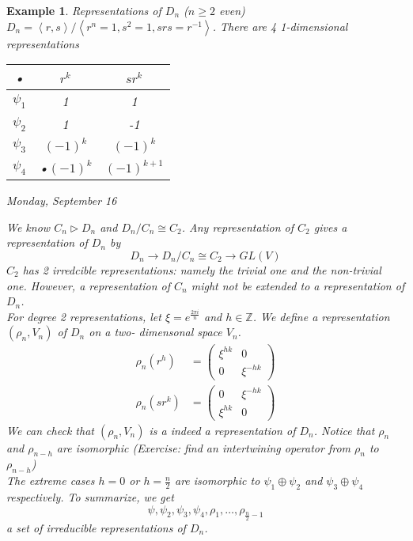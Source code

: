 \documentclass[letterpaper, leqno, 12pt]{article}
\newcommand{\fin}{\qquad \quad \hfill \framebox[1.75mm][l]{\,}}
\newcommand{\bZ}{\mathbb{Z}}
\providecommand{\ip}[1]{\left\langle #1 \right\rangle}
\theoremstyle{stdthm}
\theoremstyle{stddef}
\newtheorem{eg}[thm]{Example} %
\theoremstyle{stdnonum}
\theoremstyle{stdqands}
\theoremstyle{stdbold}
\begin{document}
\begin{eg} Representations of {$D_n$ ($n\geq 2$ even)}\\
$D_n = \ip{r,s}/\ip{r^n=1,s^2 = 1, srs = r^{-1}}$. There are 4 1-dimensional representations \\

\begin{tabular}{|c|c|c|}
\hline 
• & $r^k$ & $sr^k$ \\ 
\hline 
$\psi_1$ & 1 & 1 \\ 
\hline 
$\psi_2$  & 1 & -1 \\ 
\hline 
$\psi_3$ & $(-1)^k$ & $(-1)^k$ \\ 
\hline 
$\psi_4$ & •$(-1)^k$ & $(-1)^{k+1}$ \\ 
\hline 
\end{tabular} 

\newpage
\begin{center}
\emph{Monday, September 16}
\end{center}

We know $C_n \rhd D_n$ and $D_n/C_n \cong C_2$. Any representation of $C_2$ gives a representation of $D_n$ by 
\[D_n \rightarrow D_n/C_n \cong C_2 \rightarrow GL(V) \]
$C_2$ has 2 irredcible representations: namely the trivial one and the non-trivial one. However, a representation of $C_n$ might not be extended to a representation of $D_n$.\\

 For degree 2 representations, let $\xi = e^{\frac{2\pi i}{n}}$ and $h \in \bZ$. We define a representation  $(\rho_n,V_n)$ of $D_n$ on a two- dimensonal space $V_n$. 
 \begin{align*}
\rho_n (r^h) &= \left( \begin{array}{cc}
\xi^{hk} & 0 \\ 
0 & \xi^{-hk}
\end{array} \right)\\
\rho_n (sr^k) &= \left( \begin{array}{cc}
0 & \xi^{-hk} \\ 
\xi^{hk} & 0
\end{array} \right)
 \end{align*}
 We can check that $(\rho_n,V_n)$ is a indeed a representation of $D_n$. Notice that $\rho_n$ and $\rho_{n-h}$ are isomorphic (Exercise: find an intertwining operator from $\rho_n$ to $\rho_{n-h}$)\\
 
 The extreme cases $h=0$ or $h = \frac{n}{2}$ are isomorphic to $\psi_1 \oplus \psi_2$ and $\psi_3 \oplus \psi_4$ respectively. To summarize, we get 
 \[\psi,\psi_2,\psi_3,\psi_4,\rho_1,\dots,\rho_{\frac{n}{2} -1}\]
 a set of irreducible representations of $D_n$. \\
 

\end{eg}
\end{document}
